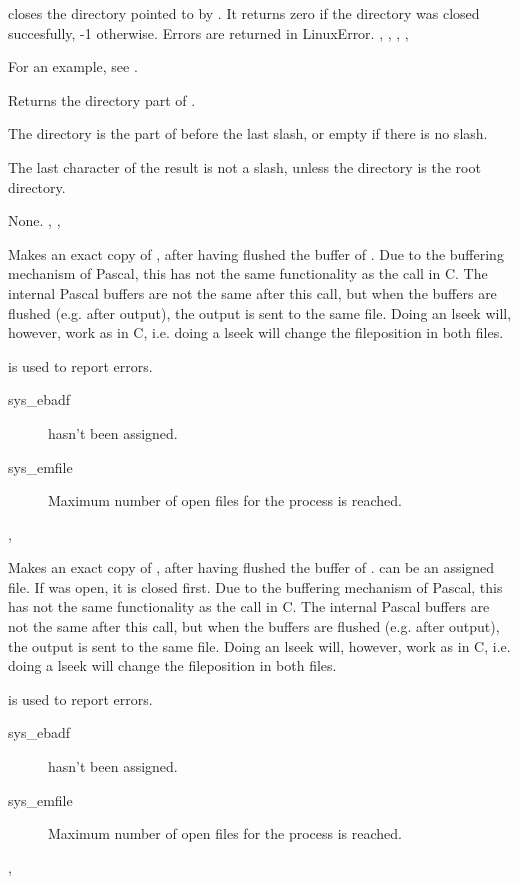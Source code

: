 

{  closes the directory pointed to by .
It returns zero if the directory was closed succesfully, -1 otherwise.}
{Errors are returned in LinuxError.}
{, , , ,
}

For an example, see .

{Returns the directory part of .

The directory is the part of  before the last slash,
or empty if there is no slash.

The last character of the result is not a slash, unless the directory is the
root directory.
}
{None.}
{, , }



{
Makes  an exact copy of , after having flushed the
buffer of . Due to the buffering mechanism of Pascal, this has not
the same functionality as the  call in C. The internal Pascal
buffers are not the same after this call, but when the buffers are flushed
(e.g. after output), the output is sent to the same file.
Doing an lseek will, however, work as in C, i.e. doing a lseek will change the
fileposition in both files.
}
{  is used to report errors.
\begin{description}
\item[sys\_ebadf]  hasn't been assigned.
\item[sys\_emfile] Maximum number of open files for the process is reached.
\end{description}
}
{,  }



{
Makes  an exact copy of , after having flushed the
buffer of .  can be an assigned file.
If  was open, it is closed first.
Due to the buffering mechanism of Pascal, this has not
the same functionality as the  call in C. The internal Pascal
buffers are not the same after this call, but when the buffers are flushed
(e.g. after output), the output is sent to the same file.
Doing an lseek will, however, work as in C, i.e. doing a lseek will change the
fileposition in both files.
}
{  is used to report errors.
\begin{description}
\item[sys\_ebadf]  hasn't been assigned.
\item[sys\_emfile] Maximum number of open files for the process is reached.
\end{description}
}
{ ,  }

